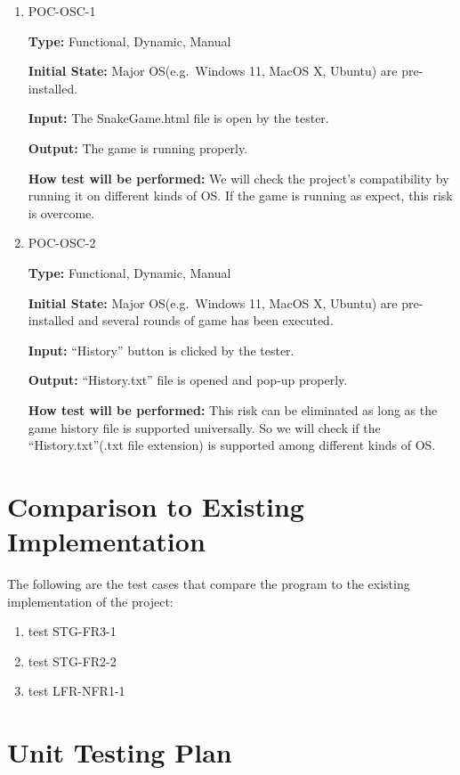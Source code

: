 \documentclass[12pt, titlepage]{article}
\begin{document}
\begin{enumerate}
\item{POC-OSC-1\\}

\textbf{Type:} Functional, Dynamic, Manual

\textbf{Initial State:} Major OS(e.g.\ Windows 11, MacOS X, Ubuntu) are pre-installed.

\textbf{Input:} The SnakeGame.html file is open by the tester.

\textbf{Output:} The game is running properly.

\textbf{How test will be performed:} We will check the project's compatibility by running it on different kinds of OS. If the game is running as expect, this risk is overcome.

\item{POC-OSC-2\\}

\textbf{Type:} Functional, Dynamic, Manual

\textbf{Initial State:} Major OS(e.g.\ Windows 11, MacOS X, Ubuntu) are pre-installed and several rounds of game has been executed.

\textbf{Input:} ``History'' button is clicked by the tester.

\textbf{Output:} ``History.txt'' file is opened and pop-up properly.

\textbf{How test will be performed:} This risk can be eliminated as long as the game history file is supported universally. So we will check if the ``History.txt''(.txt file extension) is supported among different kinds of OS.


\end{enumerate}


\section{Comparison to Existing Implementation}	
The following are the test cases that compare the program to the existing implementation of the project:
\begin{enumerate}
    \item test STG-FR3-1
    \item test STG-FR2-2
    \item test LFR-NFR1-1
\end{enumerate}


\section{Unit Testing Plan}
		
\end{document}
